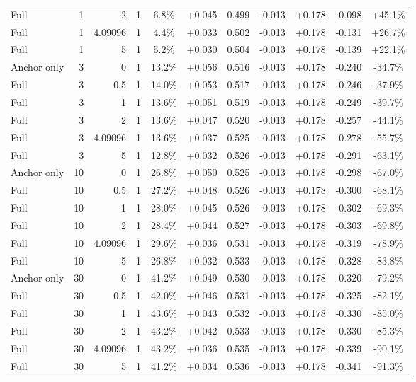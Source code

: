 \begin{table}[htbp]
\begin{tabular}{lrrrccccccc}
Full & 1 & 2 & 1 & 6.8\% & +0.045 & 0.499 & -0.013 & +0.178 & -0.098 & +45.1\% \\
Full & 1 & 4.09096 & 1 & 4.4\% & +0.033 & 0.502 & -0.013 & +0.178 & -0.131 & +26.7\% \\
Full & 1 & 5 & 1 & 5.2\% & +0.030 & 0.504 & -0.013 & +0.178 & -0.139 & +22.1\% \\
Anchor only & 3 & 0 & 1 & 13.2\% & +0.056 & 0.516 & -0.013 & +0.178 & -0.240 & -34.7\% \\
Full & 3 & 0.5 & 1 & 14.0\% & +0.053 & 0.517 & -0.013 & +0.178 & -0.246 & -37.9\% \\
Full & 3 & 1 & 1 & 13.6\% & +0.051 & 0.519 & -0.013 & +0.178 & -0.249 & -39.7\% \\
Full & 3 & 2 & 1 & 13.6\% & +0.047 & 0.520 & -0.013 & +0.178 & -0.257 & -44.1\% \\
Full & 3 & 4.09096 & 1 & 13.6\% & +0.037 & 0.525 & -0.013 & +0.178 & -0.278 & -55.7\% \\
Full & 3 & 5 & 1 & 12.8\% & +0.032 & 0.526 & -0.013 & +0.178 & -0.291 & -63.1\% \\
Anchor only & 10 & 0 & 1 & 26.8\% & +0.050 & 0.525 & -0.013 & +0.178 & -0.298 & -67.0\% \\
Full & 10 & 0.5 & 1 & 27.2\% & +0.048 & 0.526 & -0.013 & +0.178 & -0.300 & -68.1\% \\
Full & 10 & 1 & 1 & 28.0\% & +0.045 & 0.526 & -0.013 & +0.178 & -0.302 & -69.3\% \\
Full & 10 & 2 & 1 & 28.4\% & +0.044 & 0.527 & -0.013 & +0.178 & -0.303 & -69.8\% \\
Full & 10 & 4.09096 & 1 & 29.6\% & +0.036 & 0.531 & -0.013 & +0.178 & -0.319 & -78.9\% \\
Full & 10 & 5 & 1 & 26.8\% & +0.032 & 0.533 & -0.013 & +0.178 & -0.328 & -83.8\% \\
Anchor only & 30 & 0 & 1 & 41.2\% & +0.049 & 0.530 & -0.013 & +0.178 & -0.320 & -79.2\% \\
Full & 30 & 0.5 & 1 & 42.0\% & +0.046 & 0.531 & -0.013 & +0.178 & -0.325 & -82.1\% \\
Full & 30 & 1 & 1 & 43.6\% & +0.043 & 0.532 & -0.013 & +0.178 & -0.330 & -85.0\% \\
Full & 30 & 2 & 1 & 43.2\% & +0.042 & 0.533 & -0.013 & +0.178 & -0.330 & -85.3\% \\
Full & 30 & 4.09096 & 1 & 43.2\% & +0.036 & 0.535 & -0.013 & +0.178 & -0.339 & -90.1\% \\
Full & 30 & 5 & 1 & 41.2\% & +0.034 & 0.536 & -0.013 & +0.178 & -0.341 & -91.3\% \\

\end{tabular}
\end{table}
